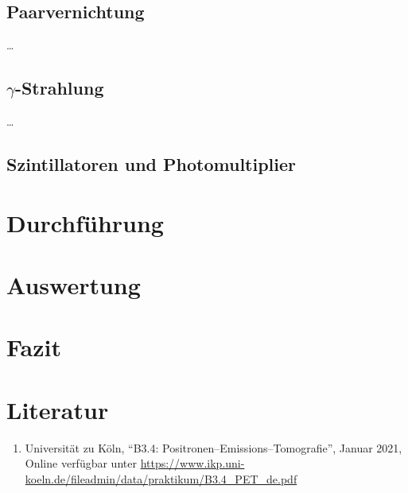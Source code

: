 \documentclass[12pt,a4paper]{scrartcl}
\numberwithin{equation}{section} %
\newcommand{\tightlist}{} %
\begin{document}
\hypertarget{paarvernichtung}{%
\subsection{Paarvernichtung}\label{paarvernichtung}}

\ldots{}

\hypertarget{gamma-strahlung}{%
\subsection{\texorpdfstring{\(\gamma\)-Strahlung}{\textbackslash gamma-Strahlung}}\label{gamma-strahlung}}

\ldots{}

\hypertarget{szintillatoren-und-photomultiplier}{%
\subsection{Szintillatoren und Photomultiplier}\label{szintillatoren-und-photomultiplier}}

\clearpage
\hypertarget{durchfuxfchrung}{%
\section{Durchführung}\label{durchfuxfchrung}}

\clearpage
\hypertarget{auswertung}{%
\section{Auswertung}\label{auswertung}}

\clearpage
\hypertarget{fazit}{%
\section{Fazit}\label{fazit}}

\clearpage
\hypertarget{literatur}{%
\section{Literatur}\label{literatur}}

\begin{enumerate}
\def\labelenumi{\arabic{enumi}.}
\tightlist
\item
  Universität zu Köln, ``B3.4: Positronen--Emissions--Tomografie'',
  Januar 2021, Online verfügbar unter
  \url{https://www.ikp.uni-koeln.de/fileadmin/data/praktikum/B3.4_PET_de.pdf}
\end{enumerate}
\end{document}
